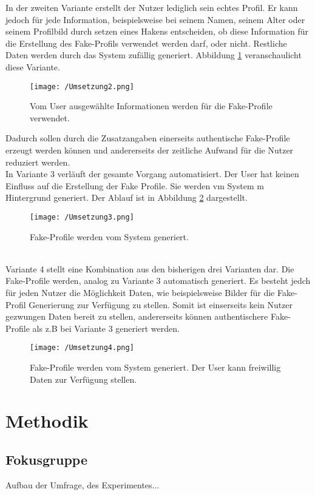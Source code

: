 \documentclass{sigchi}
\begin{document}
In der zweiten Variante erstellt der Nutzer lediglich sein echtes Profil. Er kann jedoch für jede Information, beispielsweise bei seinem Namen, seinem Alter oder seinem Profilbild durch setzen eines Hakens entscheiden, ob diese Information für die Erstellung des Fake-Profils verwendet werden darf, oder nicht. Restliche Daten werden durch das System zufällig generiert. Abbildung \ref{fig:Umsetzung2} veranschaulicht diese Variante. 
\begin{figure}[htbp]
	\texttt{[image: /Umsetzung2.png]}
	\caption{Vom User ausgewählte Informationen werden für die Fake-Profile verwendet.}
	\label{fig:Umsetzung2}
\end{figure}
Dadurch sollen durch die Zusatzangaben einerseits authentische Fake-Profile erzeugt werden können und andererseits der zeitliche Aufwand für die Nutzer reduziert werden. \\
In Variante 3 verläuft der gesamte Vorgang automatisiert. Der User hat keinen Einfluss auf die Erstellung der Fake Profile. Sie werden vm System m Hintergrund generiert. Der Ablauf ist in Abbildung \ref{fig:Umsetzung3} dargestellt.
\begin{figure}[htbp]
	\texttt{[image: /Umsetzung3.png]}
	\caption{Fake-Profile werden vom System generiert.}
	\label{fig:Umsetzung3}
\end{figure}
\\
Variante 4 stellt eine Kombination aus den bisherigen drei Varianten dar. Die Fake-Profile werden, analog zu Variante 3 automatisch generiert. Es besteht jedch für jeden Nutzer die Möglichkeit Daten, wie beispielsweise Bilder für die Fake-Profil Generierung zur Verfügung zu stellen. Somit ist einserseits kein Nutzer gezwungen Daten bereit zu stellen, andererseits können authentischere Fake-Profile als z.B bei Variante 3 generiert werden.  
\begin{figure}[htbp]
	\texttt{[image: /Umsetzung4.png]}
	\caption{Fake-Profile werden vom System generiert. Der User kann freiwillig Daten zur Verfügung stellen.}
	\label{fig:Umsetzung4}
\end{figure}
\section{Methodik}

\subsection{Fokusgruppe}
Aufbau der Umfrage, des Experimentes... 
\end{document}
